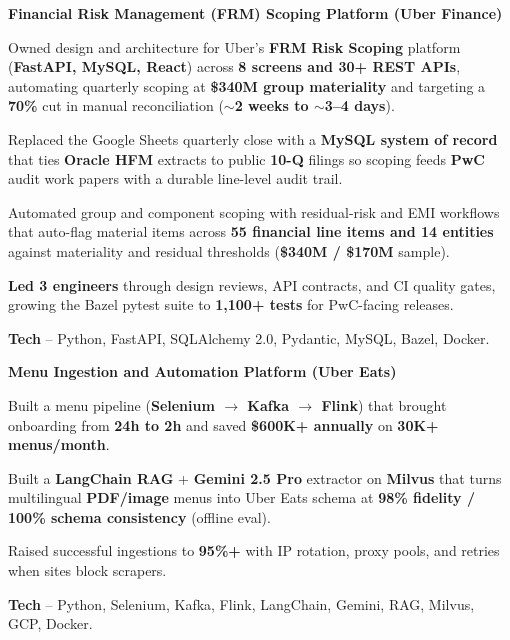 \textcolor{Project}{\textbf{Financial Risk Management (FRM) Scoping Platform (Uber Finance)}}
\vspace{-1ex}
\begin{zitemize}
    \item Owned design and architecture for Uber's \textbf{FRM Risk Scoping} platform (\textbf{FastAPI, MySQL, React}) across \textbf{8 screens and 30+ REST APIs}, automating quarterly scoping at \textbf{\$340M group materiality} and targeting a \textbf{70\%} cut in manual reconciliation (\textbf{$\sim$2 weeks to $\sim$3--4 days}).
    \item Replaced the Google Sheets quarterly close with a \textbf{MySQL system of record} that ties \textbf{Oracle HFM} extracts to public \textbf{10-Q} filings so scoping feeds \textbf{PwC} audit work papers with a durable line-level audit trail.
    \item Automated group and component scoping with residual-risk and EMI workflows that auto-flag material items across \textbf{55 financial line items and 14 entities} against materiality and residual thresholds (\textbf{\$340M / \$170M} sample).
    \item \textbf{Led 3 engineers} through design reviews, API contracts, and CI quality gates, growing the Bazel pytest suite to \textbf{1,100+ tests} for PwC-facing releases.
    \item \textbf{Tech} -- Python, FastAPI, SQLAlchemy 2.0, Pydantic, MySQL, Bazel, Docker.
\end{zitemize}
\vspace{0.3ex}

\textcolor{Project}{\textbf{Menu Ingestion and Automation Platform (Uber Eats)}}
\vspace{-1ex}
\begin{zitemize}
    \item Built a menu pipeline (\textbf{Selenium $\rightarrow$ Kafka $\rightarrow$ Flink}) that brought onboarding from \textbf{24h to 2h} and saved \textbf{\$600K+ annually} on \textbf{30K+ menus/month}.
    \item Built a \textbf{LangChain RAG} + \textbf{Gemini 2.5 Pro} extractor on \textbf{Milvus} that turns multilingual \textbf{PDF/image} menus into Uber Eats schema at \textbf{98\% fidelity / 100\% schema consistency} (offline eval).
    \item Raised successful ingestions to \textbf{95\%+} with IP rotation, proxy pools, and retries when sites block scrapers.
    \item \textbf{Tech} -- Python, Selenium, Kafka, Flink, LangChain, Gemini, RAG, Milvus, GCP, Docker.
\end{zitemize}
\vspace{0.15ex}

